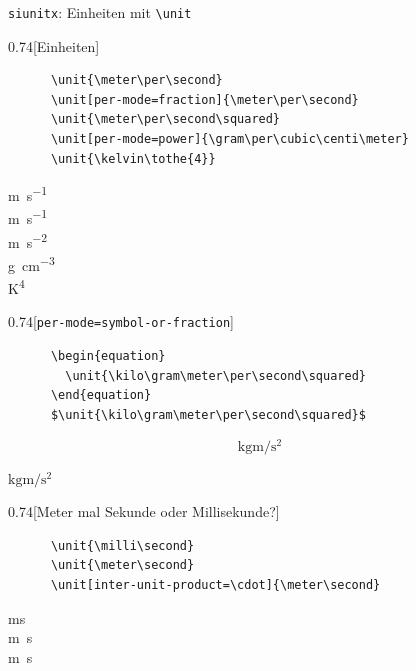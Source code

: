 \begin{frame}[fragile]{\texttt{siunitx}: Einheiten mit \texttt{\backslash unit}}
  \begin{CodeExample}{0.74}[Einheiten]
    \begin{verbatim}
      \unit{\meter\per\second}
      \unit[per-mode=fraction]{\meter\per\second}
      \unit{\meter\per\second\squared}
      \unit[per-mode=power]{\gram\per\cubic\centi\meter}
      \unit{\kelvin\tothe{4}}
    \end{verbatim}
  \CodeResult
    \strut
    \unit{\meter\per\second} \\
    \unit[per-mode=fraction]{\meter\per\second} \\
    \unit{\meter\per\second\squared} \\
    \unit[per-mode=power]{\gram\per\cubic\centi\meter} \\
    \unit{\kelvin\tothe{4}}
  \end{CodeExample}
  \begin{CodeExample}{0.74}[\texttt{per-mode=symbol-or-fraction}]
    \begin{verbatim}
      \begin{equation}
        \unit{\kilo\gram\meter\per\second\squared}
      \end{equation}
      $\unit{\kilo\gram\meter\per\second\squared}$
    \end{verbatim}
  \CodeResult
    \removedisplayskip
    \begin{minipage}[c][3\baselineskip][c]{\textwidth}
      \begin{equation}
        \unit{\kilo\gram\meter\per\second\squared}
      \end{equation}
    \end{minipage}
    $\unit{\kilo\gram\meter\per\second\squared}$
  \end{CodeExample}
  \begin{CodeExample}{0.74}[Meter mal Sekunde oder Millisekunde?]
    \begin{verbatim}
      \unit{\milli\second}
      \unit{\meter\second}
      \unit[inter-unit-product=\cdot]{\meter\second}
    \end{verbatim}
  \CodeResult
    \strut
    \unit{\milli\second} \\
    \unit{\meter\second} \\
    \unit[inter-unit-product=\cdot]{\meter\second}
  \end{CodeExample}
\end{frame}

